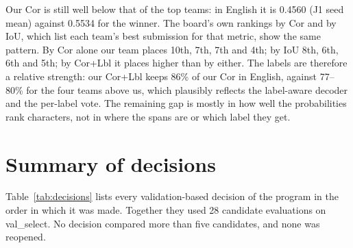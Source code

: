 \begin{table}[!htb]
    \centering
    \caption{Position on the SHROOM-Visions Cor+Lbl leaderboard (29 entries for English, 22--23 for the other languages; 16~November~2026). ``Team above'' and ``Team below'' are the other teams ranked directly above and below J1 seed 123.}
    \label{tab:leaderboard}
\end{table}

Our Cor is still well below that of the top teams: in English it is 0.4560 (J1 seed mean) against 0.5534 for the winner. The board's own rankings by Cor and by IoU, which list each team's best submission for that metric, show the same pattern. By Cor alone our team places 10th, 7th, 7th and 4th; by IoU 8th, 6th, 6th and 5th; by Cor+Lbl it places higher than by either. The labels are therefore a relative strength: our Cor+Lbl keeps 86\% of our Cor in English, against 77--80\% for the four teams above us, which plausibly reflects the label-aware decoder and the per-label vote. The remaining gap is mostly in how well the probabilities rank characters, not in where the spans are or which label they get.

\section{Summary of decisions}

Table~\ref{tab:decisions} lists every validation-based decision of the program in the order in which it was made. Together they used 28 candidate evaluations on val\_select. No decision compared more than five candidates, and none was reopened.

